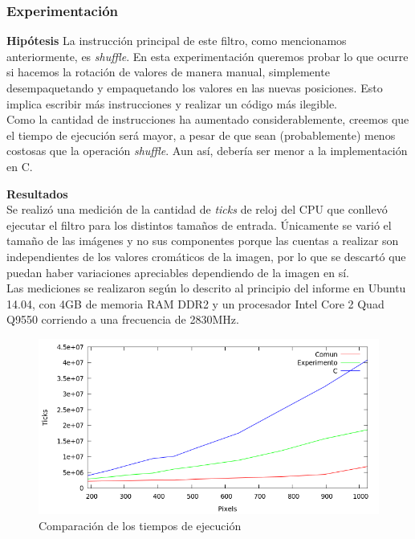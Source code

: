 \documentclass[a4paper]{article}
\begin{document}
\subsubsection{Experimentación}
\textbf{Hipótesis}
\newline
La instrucción principal de este filtro, como mencionamos anteriormente, es \textit{shuffle}. En esta experimentación queremos probar lo que ocurre si hacemos la rotación de valores de manera manual, simplemente desempaquetando y empaquetando los valores en las nuevas posiciones. Esto implica escribir más instrucciones y realizar un código más ilegible.
\\Como la cantidad de instrucciones ha aumentado considerablemente, creemos que el tiempo de ejecución será mayor, a pesar de que sean (probablemente) menos costosas que la operación \textit{shuffle}. Aun así, debería ser menor a la implementación en C. 
\newline

\textbf{Resultados}
\\Se realizó una medición de la cantidad de \textit{ticks} de reloj del CPU que conllevó ejecutar el filtro para los distintos tamaños de entrada. Únicamente se varió el tamaño de las imágenes y no sus componentes porque las cuentas a realizar son independientes de los valores cromáticos de la imagen, por lo que se descartó que puedan haber variaciones apreciables dependiendo de la imagen en sí.
\\Las mediciones se realizaron según lo descrito al principio del informe en Ubuntu 14.04, con 4GB de memoria RAM DDR2 y un procesador Intel Core 2 Quad Q9550 corriendo a una frecuencia de 2830MHz.\\

\begin{figure}[H]
  \begin{center}
	\includegraphics[scale=0.77]{imagenes/rotarExp.png}
	\caption{Comparación de los tiempos de ejecución}
	\label{rotar_exp}
  \end{center}
\end{figure}
\end{document}
